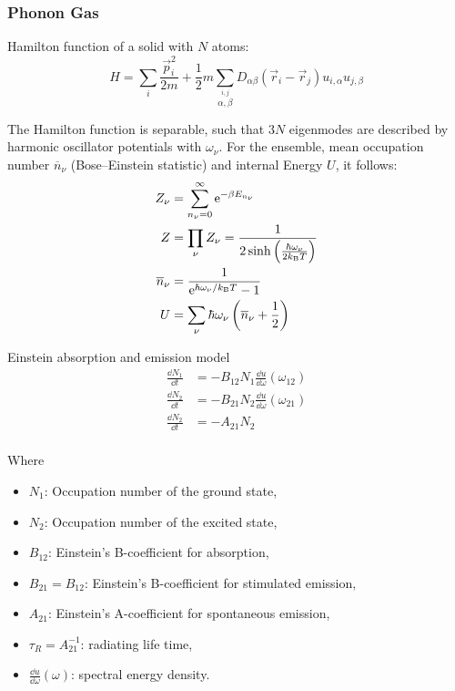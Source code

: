 		\subsubsection{Phonon Gas}
			\label{Sec:PhononGas}
			\noindent
			Hamilton function of a solid with $N$ atoms:
			\begin{equation}
				H=\sum_i \frac{\vec{p}_i^2}{2m} + \frac{1}{2}m\sum_{\stackrel{i,j}{\alpha,\beta}} D_{\alpha\beta}(\vec{r}_i - \vec{r}_j)u_{i,\alpha}u_{j,\beta}
			\end{equation}

			\noindent
			The Hamilton function is separable, such that $3N$ eigenmodes are described by harmonic oscillator potentials with $\omega_\nu$. For the ensemble, mean occupation number $\overline{n}_\nu$ (Bose--Einstein statistic) and internal Energy $U$, it follows:
			\begin{equation}
				\begin{aligned}
					Z_\nu &= \sum_{n_\nu=0}^\infty \mathrm{e}^{-\beta E_{n_\nu}} \\
					Z &= \prod_\nu Z_\nu = \frac{1}{2\sinh{\left( \frac{\hbar\omega_\nu}{2 k_{\text{B}}T} \right)}} \\
					\overline{n}_\nu &= \frac{1}{\mathrm{e}^{\hbar\omega_\nu/k_{\text{B}} T} - 1} \\
					U &= \sum_\nu \hbar\omega_\nu \left(\overline{n}_\nu + \frac{1}{2}\right)
				\end{aligned}
			\end{equation}


			\noindent
			Einstein absorption and emission model
			\begin{equation}
				\begin{aligned}
					\frac{\dd N_1}{\dd t} &= -B_{12}N_1 \frac{\dd u}{\dd \omega}(\omega_{12}) \\
					\frac{\dd N_2}{\dd t} &= -B_{21}N_2 \frac{\dd u}{\dd \omega}(\omega_{21}) \\
					\frac{\dd N_2}{\dd t} &= -A_{21}N_2\\
				\end{aligned}
			\end{equation}

			\noindent
			Where
			\begin{itemize}
				\setlength\itemsep{0pt}
				\item[] $N_1$: Occupation number of the ground state,
				\item[] $N_2$: Occupation number of the excited state,
				\item[] $B_{12}$: Einstein's B-coefficient for absorption,
				\item[] $B_{21} = B_{12}$: Einstein's B-coefficient for stimulated emission,
				\item[] $A_{21}$: Einstein's A-coefficient for spontaneous emission,
				\item[] $\tau_{R}=A_{21}^{-1}$: radiating life time,
				\item[] $\frac{\dd u}{\dd \omega}(\omega)$: spectral energy density.
			\end{itemize}

